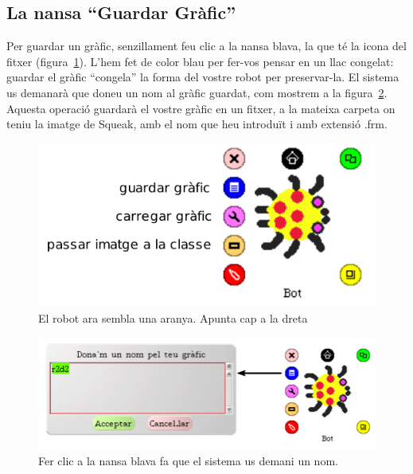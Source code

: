\subsection{La nansa ``Guardar Gràfic''}
Per guardar un gràfic, senzillament feu clic a la nansa blava, la que té la icona del fitxer (figura~\ref{fig0608}). L'hem fet de color blau per fer-vos pensar en un llac congelat: guardar el gràfic ``congela'' la forma del vostre robot per preservar-la. El sistema us demanarà que doneu un nom al gràfic guardat, com mostrem a la figura~\ref{fig0609}. Aquesta operació guardarà el vostre gràfic en un fitxer, a la mateixa carpeta on teniu la imatge de Squeak, amb el nom que heu introduït i amb extensió \textsf{.frm}.
\begin{figure}[h!]
\begin{center}
\includegraphics[scale=0.75]{Imatges/figura6-8.pdf} 
\end{center}
\caption{El robot ara sembla una aranya. Apunta cap a la dreta}
\label{fig0608}
\end{figure}
\begin{figure}[h]
\begin{center}
\includegraphics[scale=0.75]{Imatges/figura6-9.pdf} 
\end{center}
\caption{Fer clic a la nansa blava fa que el sistema us demani un nom.}
\label{fig0609}
\end{figure}

